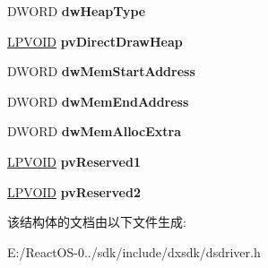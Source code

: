 \begin{DoxyCompactItemize}
D\+W\+O\+RD {\bfseries dw\+Heap\+Type}
\item 
\mbox{\label{struct___d_s_d_r_i_v_e_r_d_e_s_c_adcb73bd2d5602ad661ce6f4635cb3290}} 
\hyperlink{interfacevoid}{L\+P\+V\+O\+ID} {\bfseries pv\+Direct\+Draw\+Heap}
\item 
\mbox{\label{struct___d_s_d_r_i_v_e_r_d_e_s_c_a2f5055c9ef860c1d068ea2d2afc4e895}} 
D\+W\+O\+RD {\bfseries dw\+Mem\+Start\+Address}
\item 
\mbox{\label{struct___d_s_d_r_i_v_e_r_d_e_s_c_a75721c735f68ac183240f28fd1d82314}} 
D\+W\+O\+RD {\bfseries dw\+Mem\+End\+Address}
\item 
\mbox{\label{struct___d_s_d_r_i_v_e_r_d_e_s_c_a685c1bc2067be4dc79333f07769d5fad}} 
D\+W\+O\+RD {\bfseries dw\+Mem\+Alloc\+Extra}
\item 
\mbox{\label{struct___d_s_d_r_i_v_e_r_d_e_s_c_a4e6591a20d199fa32f056d1b599e294a}} 
\hyperlink{interfacevoid}{L\+P\+V\+O\+ID} {\bfseries pv\+Reserved1}
\item 
\mbox{\label{struct___d_s_d_r_i_v_e_r_d_e_s_c_a10f6af4b583ca2bb3f853fd5eb217532}} 
\hyperlink{interfacevoid}{L\+P\+V\+O\+ID} {\bfseries pv\+Reserved2}
\end{DoxyCompactItemize}


该结构体的文档由以下文件生成\+:\begin{DoxyCompactItemize}
\item 
E\+:/\+React\+O\+S-\/0../sdk/include/dxsdk/dsdriver.\+h\end{DoxyCompactItemize}
